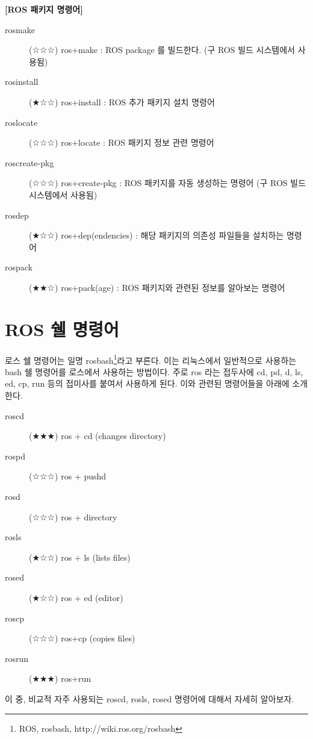 \vspace{\baselineskip}
\noindent
\textbf{[ROS 패키지 명령어]}
\begin{description}
\item[rosmake] (☆☆☆) ros+make : ROS package 를 빌드한다. (구 ROS 빌드 시스템에서 사용됨)
\item[rosinstall] (★☆☆) ros+install : ROS 추가 패키지 설치 명령어
\item[roslocate] (☆☆☆) ros+locate : ROS 패키지 정보 관련 명령어 
\item[roscreate-pkg] (☆☆☆) ros+create-pkg : ROS 패키지를 자동 생성하는 명령어 (구 ROS 빌드 시스템에서 사용됨)
\item[rosdep] (★☆☆) ros+dep(endencies) : 해당 패키지의 의존성 파일들을 설치하는 명령어
\item[rospack] (★★☆) ros+pack(age) : ROS 패키지와 관련된 정보를 알아보는 명령어
\end{description}

\section{ROS 쉘 명령어}

로스 쉘 명령어는 일명 rosbash\footnote{ROS, rosbash, http://wiki.ros.org/rosbash}라고 부른다. 이는 리눅스에서 일반적으로 사용하는 bash 쉘 명령어를 로스에서 사용하는 방법이다. 주로 ros 라는 접두사에 cd, pd, d, ls, ed, cp, run 등의 접미사를 붙여서 사용하게 된다. 이와 관련된 명령어들을 아래에 소개한다.  

\vspace{\baselineskip}
\noindent
\begin{description}
\item[roscd] (★★★) ros + cd (changes directory) 
\item[rospd] (☆☆☆) ros + pushd 
\item[rosd] (☆☆☆) ros + directory
\item[rosls] (★☆☆) ros + ls (lists files)
\item[rosed] (★☆☆) ros + ed (editor)
\item[roscp] (☆☆☆) ros+cp (copies files)
\item[rosrun] (★★★) ros+run 
\end{description}

\vspace{\baselineskip}
\noindent
이 중, 비교적 자주 사용되는 roscd, rosls, rosed 명령어에 대해서 자세히 알아보자.

